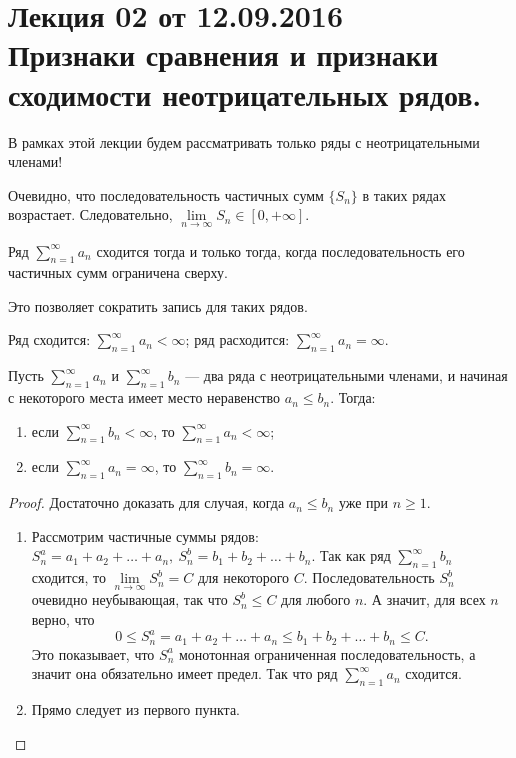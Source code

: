 \documentclass[a4paper, 12pt]{article}
\begin{document}
\pagestyle{fancy}
\section{Лекция 02 от 12.09.2016 \\Признаки сравнения и признаки сходимости неотрицательных рядов.}

В рамках этой лекции будем рассматривать только ряды с неотрицательными членами!

Очевидно, что последовательность частичных сумм $\{S_n \}$ в таких рядах возрастает. Следовательно, $\lim\limits_{n\rightarrow \infty}S_n \in [0, +\infty]$.

\begin{Statement}
	Ряд $\sum\limits_{n=1}^{\infty} a_n$ сходится тогда и только тогда, когда последовательность его частичных сумм ограничена сверху.
\end{Statement}

Это позволяет сократить запись для таких рядов.
\begin{Designation} Ряд сходится: $\sum\limits_{n=1}^{\infty} a_n < \infty$; ряд расходится: $\sum\limits_{n=1}^{\infty} a_n = \infty$.
\end{Designation}

\begin{Test}
	Пусть $\sum\limits_{n=1}^{\infty} a_n$ и $\sum\limits_{n=1}^{\infty} b_n$ --- два ряда с неотрицательными членами, и начиная с некоторого места имеет место неравенство $a_n \le b_n$. Тогда:
	\begin{enumerate}
	\item если $\sum\limits_{n=1}^{\infty} b_n < \infty$, то $\sum\limits_{n=1}^{\infty} a_n < \infty$;
	\item если $\sum\limits_{n=1}^{\infty} a_n = \infty$, то $\sum\limits_{n=1}^{\infty} b_n = \infty$.
	\end{enumerate}
\end{Test}

\begin{proof} Достаточно доказать для случая, когда $a_n \le b_n$ уже при $n \ge 1$.
\begin{enumerate}
\item Рассмотрим частичные суммы рядов: $S^a_n = a_1 + a_2 + \ldots + a_n,\ S^b_n = b_1 + b_2 + \ldots + b_n.$
Так как ряд $\sum\limits_{n=1}^{\infty} b_n$ сходится, то $\lim\limits_{n\to\infty} S^b_n = C$ для некоторого $C$. Последовательность $S^b_n$ очевидно неубывающая, так что $S^b_n \le C$ для любого $n$. А значит, для всех $n$ верно, что
$$ 0 \le S^a_n = a_1 + a_2 + \ldots + a_n \le b_1 + b_2 + \ldots + b_n \le C.$$
Это показывает, что  $S^a_n$ монотонная ограниченная последовательность, а значит она обязательно имеет предел. Так что ряд $\sum\limits_{n=1}^{\infty} a_n$  сходится.
	
\item Прямо следует из первого пункта.
\end{enumerate}
\end{proof}
\end{document}
